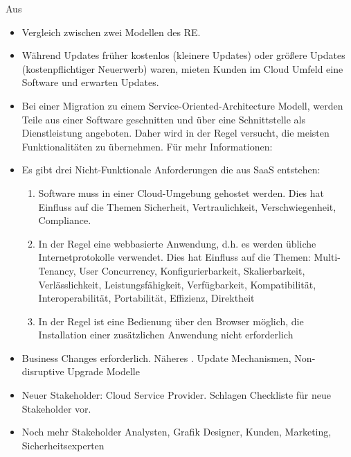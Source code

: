 Aus 
\begin{itemize}
	\item Vergleich zwischen zwei Modellen des RE.
	\item Während Updates früher kostenlos (kleinere Updates) oder größere 
Updates (kostenpflichtiger Neuerwerb) waren, mieten Kunden im Cloud Umfeld eine 
Software und erwarten Updates.
	\item Bei einer Migration zu einem Service-Oriented-Architecture 
Modell, werden Teile aus einer Software geschnitten und über eine Schnittstelle 
als Dienstleistung angeboten. Daher wird in der Regel versucht, die meisten 
Funktionalitäten zu übernehmen. Für mehr Informationen: 
	\item Es gibt drei Nicht-Funktionale Anforderungen die aus SaaS 
entstehen: 
\begin{enumerate}
	\item Software muss in einer Cloud-Umgebung gehostet werden. Dies 
hat Einfluss auf die Themen Sicherheit, Vertraulichkeit, Verschwiegenheit, 
Compliance.
	\item In der Regel eine webbasierte Anwendung, d.h. es werden übliche 
Internetprotokolle verwendet. Dies hat Einfluss auf die Themen: Multi-Tenancy, 
User Concurrency, Konfigurierbarkeit, Skalierbarkeit, Verlässlichkeit, 
Leistungsfähigkeit, Verfügbarkeit, Kompatibilität, Interoperabilität, 
Portabilität, Effizienz, Direktheit
	\item In der Regel ist eine Bedienung über den Browser möglich, die 
Installation einer zusätzlichen Anwendung nicht erforderlich
\end{enumerate}
	\item Business Changes erforderlich. Näheres 
. Update Mechanismen, Non-disruptive Upgrade 
Modelle
	\item {} 
Neuer Stakeholder: Cloud Service Provider. Schlagen Checkliste für neue 
Stakeholder vor.
	\item Noch mehr Stakeholder Analysten, Grafik Designer, Kunden, 
Marketing, Sicherheitsexperten 
\end{itemize}

